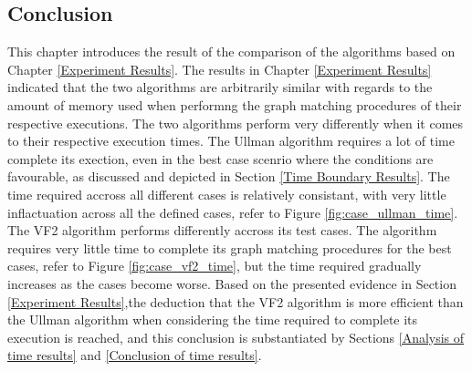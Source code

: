 \subsection{Conclusion}
\label{Conclusion}
This chapter introduces the result of the comparison of the algorithms based on Chapter \ref{Experiment Results}. The results in Chapter \ref{Experiment Results} 
indicated that the two algorithms are arbitrarily similar with regards to the amount of memory used when performng the graph matching procedures of their
respective executions.\newline\newline
The two algorithms perform very differently when it comes to their respective execution times. The Ullman algorithm requires a lot of time complete its 
exection, even in the best case scenrio where the conditions are favourable, as discussed and depicted in Section \ref{Time Boundary Results}. 
The time required accross all different cases is relatively consistant, with very little inflactuation across all the defined cases, refer to Figure \ref{fig:case_ullman_time}.\newline\newline
The VF2 algorithm performs differently accross its test cases. The algorithm requires very little time to complete its graph matching procedures for the 
best cases, refer to Figure \ref{fig:case_vf2_time}, but the time required gradually increases as the cases become worse. \newline\newline
Based on the presented evidence in Section \ref{Experiment Results},the deduction that the VF2 algorithm is more efficient than the Ullman algorithm when considering the time 
required to complete its execution is reached, and this conclusion is substantiated by Sections \ref{Analysis of time results} and \ref{Conclusion of time results}.
\newpage